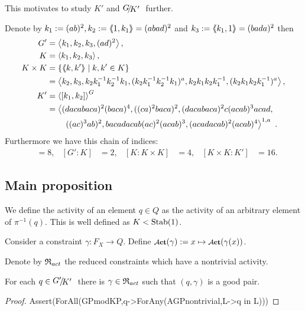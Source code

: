 \documentclass[a4paper,12pt]{article}
\begin{document}
This motivates to study $K'$ and $\RNK{G}{K'}$ further.
\begin{lem} \label{lem:subgroupsOfG}
Denote by $k_1 := (ab)^2, k_2:=\langle\negthickspace\langle1,k_1\rangle\negthickspace\rangle = (abad)^2$ and $k_3:=\langle\negthickspace\langle k_1,1\rangle\negthickspace\rangle = (bada)^2$ then 
 \begin{align*}
  G' &= \left< k_1,k_2,k_3,(ad)^2\right>, \\
  K &= \left< k_1,k_2,k_3\right>, \\
  K\times K &= \{\langle\negthickspace\langle k,k'\rangle\negthickspace\rangle \mid k,k'\in K\} \\&= \left< k_2,k_3,k_2k_1^{-1}k_2^{-1}k_1,(k_2k_1^{-1}k_2^{-1}k_1)^a,k_2k_1k_2k_1^{-1},(k_2k_1k_2k_1^{-1})^a  \right>,\\
  K' &= \left< [k_1,k_2] \right>^G \\ 
  &= \left<(dacabaca)^2(baca)^4,((ca)^2baca)^2,(dacabaca)^2c(acab)^3acad,\right.\\
  &\qquad\left.((ac)^3ab)^2, bacadacab(ac)^2(acab)^3, (acadacab)^2(acab)^4\right>^{1,a}\ .
 \end{align*}
Furthermore we have this chain of indices:
\begin{align*}
  [G:G']&=8, & [G':K]&=2, &[K:K\times K]&= 4, &[K\times K:K']&=16. 
\end{align*}
\end{lem}

\subsection{Main proposition}
\begin{defi}
 We define the activity of an element $q\in Q$ as the activity of an arbitrary element of $\pi^{-1}(q)$. 
 This is well defined as $K<\textup{Stab}(1)$. 

 Consider a constraint $\gamma\colon F_X \to Q$. 
 Define $\act(\gamma):= x \mapsto \act(\gamma(x))$.
 
 Denote by $\mathfrak{R}_{act}$ the reduced constraints which have a nontrivial activity.
\end{defi}

\begin{lem} \label{lem:existsGoodGamma}
 For each $q\in\RNK{G'}{K'}$ there is $\gamma\in \mathfrak{R}_{act}$ such that $(q,\gamma)$ is a 
 good pair.
\end{lem}
\begin{proof}
 Assert(ForAll(GPmodKP,q->ForAny(AGPnontrivial,L->q in L)))
\end{proof}
\end{document}
